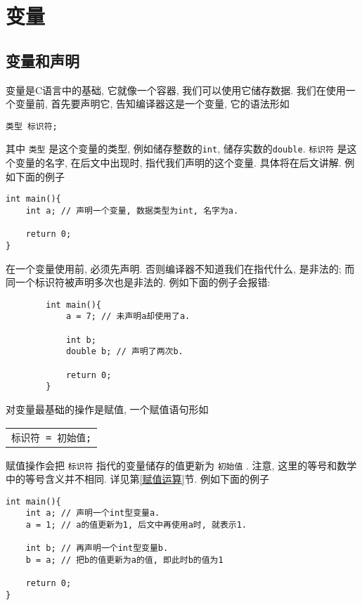 \chapter{变量} \label{变量}
    \section{变量和声明}
        变量是C语言中的基础, 它就像一个容器, 我们可以使用它储存数据. 我们在使用一个变量前, 首先要声明它, 告知编译器这是一个变量, 它的语法形如
        \begin{center}
            \texttt{类型~标识符;}
        \end{center}

        其中 \texttt{类型} 是这个变量的类型, 例如储存整数的\texttt{int}, 储存实数的\texttt{double}. \texttt{标识符} 是这个变量的名字, 在后文中出现时, 指代我们声明的这个变量. 具体将在后文讲解. 例如下面的例子
\begin{lstlisting}
int main(){
    int a; // 声明一个变量, 数据类型为int, 名字为a. 

    return 0;
}
\end{lstlisting}

        在一个变量使用前, 必须先声明. 否则编译器不知道我们在指代什么, 是非法的; 而同一个标识符被声明多次也是非法的. 例如下面的例子会报错:
        \begin{lstlisting}
        int main(){
            a = 7; // 未声明a却使用了a.
        
            int b;
            double b; // 声明了两次b.
        
            return 0;
        }
        \end{lstlisting}

        对变量最基础的操作是赋值, 一个赋值语句形如
        \begin{center}
        \begin{longtable}{l}
            \texttt{标识符 = 初始值;}
        \end{longtable}
        \end{center}

        赋值操作会把 \texttt{标识符} 指代的变量储存的值更新为 \texttt{初始值} . 注意, 这里的等号和数学中的等号含义并不相同. 详见第\ref{赋值运算}节. 例如下面的例子
\begin{lstlisting}
int main(){
    int a; // 声明一个int型变量a.
    a = 1; // a的值更新为1, 后文中再使用a时, 就表示1.

    int b; // 再声明一个int型变量b.
    b = a; // 把b的值更新为a的值, 即此时b的值为1

    return 0;
}
\end{lstlisting}

